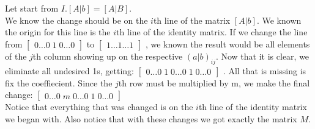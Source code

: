\documentclass[12pt]{article}
\begin{document}
Let start from $I.[A|b] = [A|B]$.\\
We know the change should be on the $i$th line of the matrix $[A|b]$. We known the origin  for this line is the $i$th line of the identity matrix. If we change the line from 
$
\begin{bmatrix}
	0 \hdots 0 \; 1 \; 0 \hdots 0
\end{bmatrix}
$
to 
$
\begin{bmatrix}
	1 \hdots 1 \hdots 1
\end{bmatrix}
$
, we known the result would be all elements of the $j$th column showing up on the respective $(a|b)_{ij}$. Now that it is clear, we eliminate all undesired 1s, getting:
$
\begin{bmatrix}
	0 \hdots 0 \; 1 \; 0 \hdots 0 \; 1 \; 0 \hdots	0
\end{bmatrix}
$
. All that is missing is fix the coeffiecient. Since the $j$th row must be multiplied by m, we make the final change: 
$
\begin{bmatrix}
	0 \hdots 0 \; m \; 0 \hdots 0 \; 1 \; 0 \hdots	0
\end{bmatrix}
$\\

Notice that everything that was changed is on the $i$th line of the identity matrix we began with. Also notice that with these changes we got exactly the matrix $M$.
\end{document}
